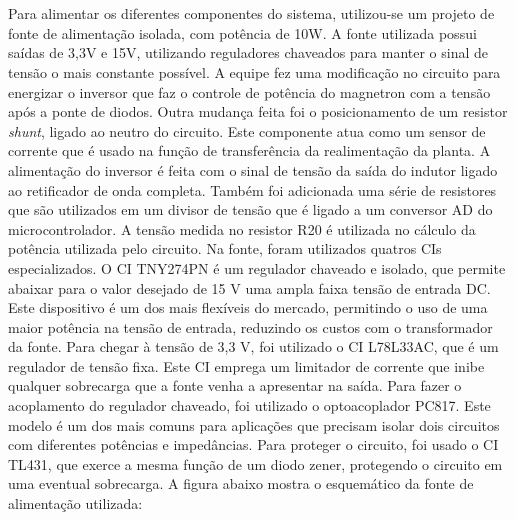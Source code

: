 \section{}
\label{sec:font}

 Para alimentar os diferentes componentes do sistema, utilizou-se um projeto de fonte de alimentação isolada, com potência de 10W. A fonte utilizada possui saídas de 3,3V e 15V, utilizando reguladores chaveados para manter o sinal de tensão o mais constante possível. A equipe fez uma modificação no circuito para energizar o inversor que faz o controle de potência do magnetron com a tensão após a ponte de diodos. Outra mudança feita foi o posicionamento de um resistor \textit{shunt}, ligado ao neutro do circuito. Este componente atua como um sensor de corrente que é usado na função de transferência da realimentação da planta. A alimentação do inversor é feita com o sinal de tensão da saída do indutor ligado ao retificador de onda completa. Também foi adicionada uma série de resistores que são utilizados em um divisor de tensão que é ligado a um conversor AD do microcontrolador. A tensão medida no resistor R20 é utilizada no cálculo da potência utilizada pelo circuito. Na fonte, foram utilizados quatros CIs especializados. O CI TNY274PN é um regulador chaveado e isolado, que permite abaixar para o valor desejado de 15 V uma ampla faixa tensão de entrada DC. Este dispositivo é um dos mais flexíveis do mercado, permitindo o uso de uma maior potência na tensão de entrada, reduzindo os custos com o transformador da fonte. Para chegar à tensão de 3,3 V, foi utilizado o CI L78L33AC, que é um regulador de tensão fixa. Este CI emprega um limitador de corrente que inibe qualquer sobrecarga que a fonte venha a apresentar na saída. Para fazer o acoplamento do regulador chaveado, foi utilizado o optoacoplador PC817. Este modelo é um dos mais comuns para aplicações que precisam isolar dois circuitos com diferentes potências e impedâncias. Para proteger o circuito, foi usado o CI TL431, que exerce a mesma função de um diodo zener, protegendo o circuito em uma eventual sobrecarga. A figura abaixo mostra o esquemático da fonte de alimentação utilizada:

